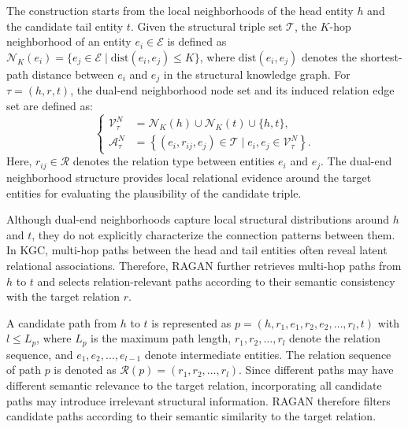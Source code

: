 \documentclass[pdflatex,sn-mathphys-num]{sn-jnl}
\begin{document}
The construction starts from the local neighborhoods of the head entity $h$ and the candidate tail entity $t$. Given the structural triple set $\mathcal{T}$, the $K$-hop neighborhood of an entity $e_i\in\mathcal{E}$ is defined as
$\mathcal{N}_{K}(e_i)=\{e_j\in\mathcal{E}\mid \mathrm{dist}(e_i,e_j)\leq K\}$,
where $\mathrm{dist}(e_i,e_j)$ denotes the shortest-path distance between $e_i$ and $e_j$ in the structural knowledge graph. For $\tau=(h,r,t)$, the dual-end neighborhood node set and its induced relation edge set are defined as:
\begin{equation}
\left\{
\begin{aligned}
\mathcal{V}_{\tau}^{N}
&=
\mathcal{N}_{K}(h)
\cup
\mathcal{N}_{K}(t)
\cup
\{h,t\}, \\
\mathcal{A}_{\tau}^{N}
&=
\left\{
(e_i,r_{ij},e_j)\in\mathcal{T}
\mid
e_i,e_j\in\mathcal{V}_{\tau}^{N}
\right\}.
\end{aligned}
\right.
\end{equation}
Here, $r_{ij}\in\mathcal{R}$ denotes the relation type between entities $e_i$ and $e_j$. The dual-end neighborhood structure provides local relational evidence around the target entities for evaluating the plausibility of the candidate triple.

Although dual-end neighborhoods capture local structural distributions around $h$ and $t$, they do not explicitly characterize the connection patterns between them. In KGC, multi-hop paths between the head and tail entities often reveal latent relational associations. Therefore, RAGAN further retrieves multi-hop paths from $h$ to $t$ and selects relation-relevant paths according to their semantic consistency with the target relation $r$.

A candidate path from $h$ to $t$ is represented as
$p=(h,r_1,e_1,r_2,e_2,\ldots,r_l,t)$ with $l\leq L_p$, where $L_p$ is the maximum path length, $r_1,r_2,\ldots,r_l$ denote the relation sequence, and $e_1,e_2,\ldots,e_{l-1}$ denote intermediate entities. The relation sequence of path $p$ is denoted as $\mathcal{R}(p)=(r_1,r_2,\ldots,r_l)$. Since different paths may have different semantic relevance to the target relation, incorporating all candidate paths may introduce irrelevant structural information. RAGAN therefore filters candidate paths according to their semantic similarity to the target relation.
\end{document}
